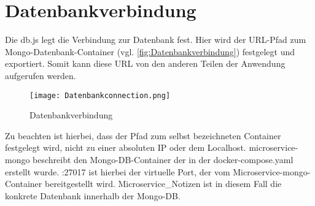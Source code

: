 
\chapter{Datenbankverbindung}
\label{ch:Datenbankverbindung}
Die db.js legt die Verbindung zur Datenbank fest. Hier wird der URL-Pfad zum Mongo-Datenbank-Container (vgl. \autoref{fig:Datenbankverbindung}) festgelegt und exportiert. Somit kann diese URL von den anderen Teilen der Anwendung aufgerufen werden. 

\begin{figure}[h]
\texttt{[image: Datenbankconnection.png]}
\vspace{1pt}
\caption{Datenbankverbindung}
\label{fig:Datenbankverbindung}
\end{figure}

Zu beachten ist hierbei, dass der Pfad zum selbst bezeichneten Container festgelegt wird, nicht zu einer absoluten IP oder dem Localhost. \glqq  microservice-mongo\grqq{} beschreibt den Mongo-DB-Container der in der docker-compose.yaml erstellt wurde. \glqq  :27017\grqq{} ist hierbei der virtuelle Port, der vom Microservice-mongo-Container bereitgestellt wird. \glqq  Microservice\_Notizen\grqq{} ist in diesem Fall die konkrete Datenbank innerhalb der Mongo-DB.


